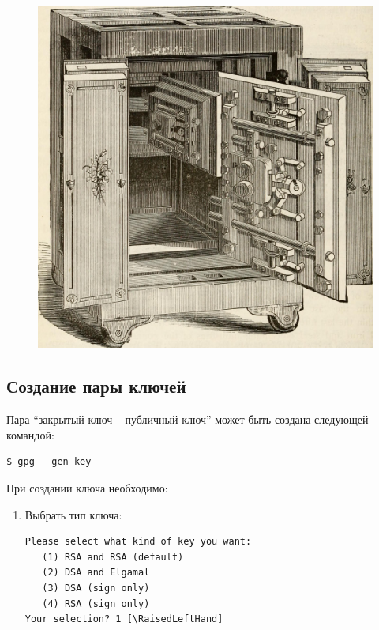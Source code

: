\documentclass[presentation]{beamer}
\newcommand{\RaisedLeftHand}{%
  \raisebox{-.50em}{\Large\HandLeft}
}
\begin{document}
\begin{frame}{}
  \begin{figure}[htb]
    \centering
    \includegraphics[height=0.6\textheight]{safe-00}
  \end{figure}
\end{frame}



\subsection{Создание пары ключей}

\begin{frame}[fragile]{}
  Пара ``закрытый ключ -- публичный ключ'' может быть создана
  следующей командой:
\begin{verbatim}
$ gpg --gen-key
\end{verbatim}
  При создании ключа необходимо:
  \begin{enumerate}
  \item Выбрать тип ключа:
    \small
\begin{Verbatim}[commandchars=\\\[\]]
Please select what kind of key you want:
   (1) RSA and RSA (default)
   (2) DSA and Elgamal
   (3) DSA (sign only)
   (4) RSA (sign only)
Your selection? 1 [\RaisedLeftHand]
\end{Verbatim}
\normalsize
    \end{enumerate}
\end{frame}
\end{document}

